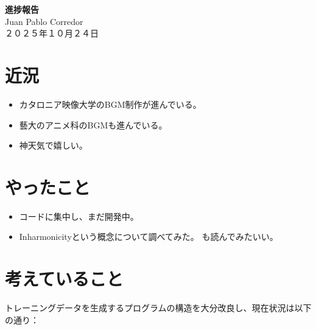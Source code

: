 \documentclass[a4paper, 11pt]{article}
\begin{document}
\begin{center}
    {\LARGE \bfseries 進捗報告} \\ %
    \vspace{0.3em} %
    Juan Pablo Corredor \\ %
    ２０２５年１０月２４日 %
\end{center}
\vspace{0.5em} %

\section*{近況}
\begin{itemize}
    \item カタロニア映像大学のBGM制作が進んでいる。
    \item 藝大のアニメ科のBGMも進んでいる。
    \item 神天気で嬉しい。
\end{itemize} 

\section*{やったこと}
\begin{itemize}
    \item コードに集中し、まだ開発中。
    \item Inharmonicityという概念について調べてみた。\cite{houtsma1982inharmonicity} \newline \cite{murray2022inharmonicity}も読んでみたいい。
\end{itemize}


\section*{考えていること}

トレーニングデータを生成するプログラムの構造を大分改良し、現在状況は以下の通り：
\end{document}
